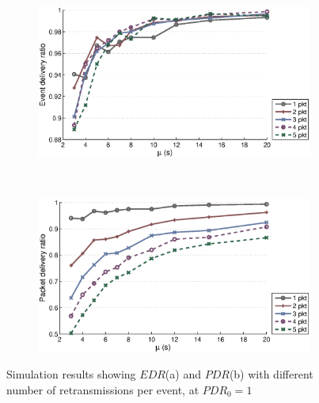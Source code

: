 \begin{figure}[p]
    \centering
    \begin{subfigure}[t]{0.9\textwidth}
        \centering
        \includegraphics[width=\textwidth] {../../sw/pc/matlab/simulation-result/retrans-count-edr-250evt-pdr1.eps}
        \caption{}
    \end{subfigure} 
    \\
    \begin{subfigure}[t]{0.9\textwidth}
        \centering
        \includegraphics[width=\textwidth] {../../sw/pc/matlab/simulation-result/retrans-count-pdr-250evt-pdr1.eps}
        \caption{}
    \end{subfigure}
    \caption[$EDR$ and $PDR$ with different transmission redundancy, $PDR_0 = 1$]{Simulation results showing $EDR$(a) and $PDR$(b) with different number of retransmissions per event, at $PDR_0 = 1$}\label{fig:retrans-lambda-1}
\end{figure}


